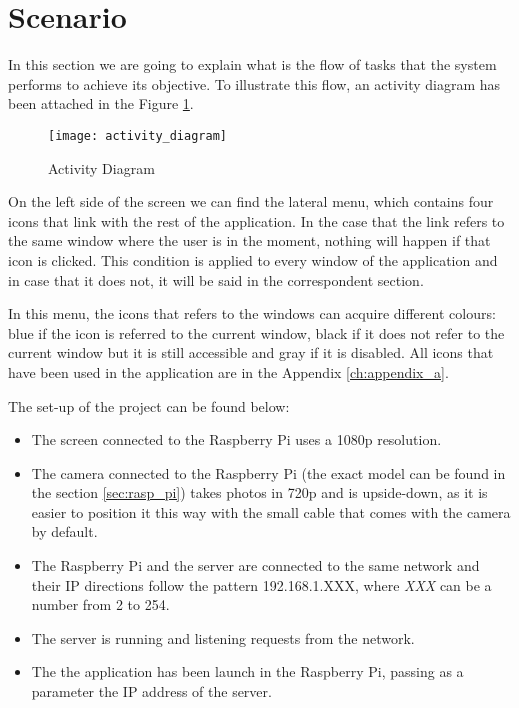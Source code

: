 \section{Scenario}
\label{sec:scenario}

In this section we are going to explain what is the flow of tasks that the system performs to achieve its objective. To illustrate this flow, an activity diagram has been attached in the Figure \ref{fig:activity_diagram}. 

\begin{figure}[!ht]
	\centering
	\texttt{[image: activity\_diagram]}
	\caption{Activity Diagram}
	\label{fig:activity_diagram}
\end{figure}	

On the left side of the screen we can find the lateral menu, which contains four icons that link with the rest of the application. In the case that the link refers to the same window where the user is in the moment, nothing will happen if that icon is clicked. This condition is applied to every window of the application and in case that it does not, it will be said in the correspondent section.

In this menu, the icons that refers to the windows can acquire different colours: blue if the icon is referred to the current window, black if it does not refer to the current window but it is still accessible and gray if it is disabled. All icons that have been used in the application are in the Appendix \ref{ch:appendix_a}.

\clearpage

The set-up of the project can be found below:

\begin{itemize} 
	\item The screen connected to the Raspberry Pi uses a \gls{1080p} resolution.
	\item The camera connected to the Raspberry Pi (the exact model can be found in the section \ref{sec:rasp_pi}) takes photos in \gls{720p} and is upside-down, as it is easier to position it this way with the small cable that comes with the camera by default. 
	\item The Raspberry Pi and the server are connected to the same network and their IP directions follow the pattern 192.168.1.XXX, where \textit{XXX} can be a number from 2 to 254.
	\item The server is running and listening requests from the network.
	\item The the application has been launch in the Raspberry Pi, passing as a parameter the IP address of the server. 
\end{itemize}


